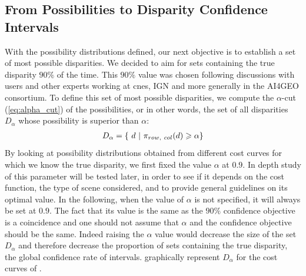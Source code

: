 \subsection{From Possibilities to Disparity Confidence Intervals}
With the possibility distributions defined, our next objective is to establish a set of most possible disparities. We decided to aim for sets containing the true disparity $90\%$ of the time. This $90\%$ value was chosen following discussions with users and other experts working at \acrshort{cnes}, IGN and more generally in the AI4GEO consortium. To define this set of most possible disparities, we compute the $\alpha$-cut (\cref{eq:alpha_cut}) of the possibilities, or in other words, the set of all disparities $D_\alpha$ whose possibility is superior than $\alpha$:
\begin{align}
    D_\alpha=\{~ d ~|~ \pi_{row, ~col}(d)\geqslant\alpha\}\label{eq:set_of_possible_disparities}
\end{align}
By looking at possibility distributions obtained from different cost curves for which we know the true disparity, we first fixed the value $\alpha$ at $0.9$. In depth study of this parameter will be tested later, in order to see if it depends on the cost function, the type of scene considered, and to provide general guidelines on its optimal value. In the following, when the value of $\alpha$ is not specified, it will always be set at $0.9$. The fact that its value is the same as the $90\%$ confidence objective is a coincidence and one should not assume that $\alpha$ and the confidence objective should be the same. Indeed raising the $\alpha$ value would decrease the size of the set $D_\alpha$ and therefore decrease the proportion of sets containing the true disparity, \ie the global confidence rate of intervals.  graphically represent $D_\alpha$ for the cost curves of .

